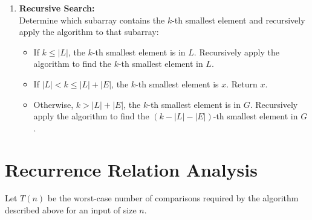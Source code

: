 \documentclass[11pt, a4paper, oneside]{memoir}
\begin{document}
\begin{enumerate}
    \item \textbf{Recursive Search:} \\
          Determine which subarray contains the $k$-th smallest element and recursively apply the algorithm to that subarray:
          \begin{itemize}
              \item If $k \le |L|$, the $k$-th smallest element is in $L$. Recursively apply the algorithm to find the $k$-th smallest element in $L$.
              \item If $|L| < k \le |L| + |E|$, the $k$-th smallest element is $x$. Return $x$.
              \item Otherwise, $k > |L| + |E|$, the $k$-th smallest element is in $G$. Recursively apply the algorithm to find the $(k-|L|-|E|)$-th smallest element in $G$.
          \end{itemize}
\end{enumerate}

\section{Recurrence Relation Analysis}
Let $T(n)$ be the worst-case number of comparisons required by the algorithm described above for an input of size $n$.
\end{document}
